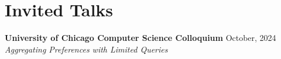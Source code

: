 \documentclass{article}
\begin{document}
%
%    
%    
    
\section{Invited Talks}

\textbf{University of Chicago Computer Science Colloquium} \hfill October, 2024 \\
\textit{Aggregating Preferences with Limited Queries}
\end{document}
